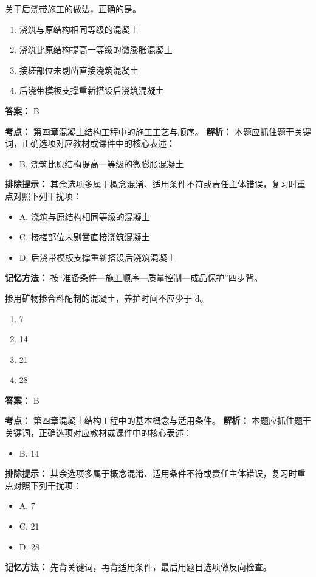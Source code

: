 \documentclass[UTF8,fontset=fandol,11pt]{ctexart}
\begin{document}
\begin{quizbox}[title={第 78 题}]
关于后浇带施工的做法，正确的是。\\
\begin{enumerate}[label=\Alph*.]
\item 浇筑与原结构相同等级的混凝土
\item 浇筑比原结构提高一等级的微膨胀混凝土
\item 接槎部位未剔凿直接浇筑混凝土
\item 后浇带模板支撑重新搭设后浇筑混凝土
\end{enumerate}
\textbf{答案：} B
\vspace{0.25em}
\begin{answerbox}[title={考点解析}]
\textbf{考点：} 第四章混凝土结构工程中的施工工艺与顺序。
\textbf{解析：} 本题应抓住题干关键词，正确选项对应教材或课件中的核心表述：
\begin{itemize}
\item B. 浇筑比原结构提高一等级的微膨胀混凝土
\end{itemize}
\textbf{排除提示：} 其余选项多属于概念混淆、适用条件不符或责任主体错误，复习时重点对照下列干扰项：
\begin{itemize}
\item A. 浇筑与原结构相同等级的混凝土
\item C. 接槎部位未剔凿直接浇筑混凝土
\item D. 后浇带模板支撑重新搭设后浇筑混凝土
\end{itemize}
\textbf{记忆方法：} 按“准备条件—施工顺序—质量控制—成品保护”四步背。
\end{answerbox}
\end{quizbox}

\vspace{0.2em}

\begin{quizbox}[title={第 79 题}]
掺用矿物掺合料配制的混凝土，养护时间不应少于 d。\\
\begin{enumerate}[label=\Alph*.]
\item 7
\item 14
\item 21
\item 28
\end{enumerate}
\textbf{答案：} B
\vspace{0.25em}
\begin{answerbox}[title={考点解析}]
\textbf{考点：} 第四章混凝土结构工程中的基本概念与适用条件。
\textbf{解析：} 本题应抓住题干关键词，正确选项对应教材或课件中的核心表述：
\begin{itemize}
\item B. 14
\end{itemize}
\textbf{排除提示：} 其余选项多属于概念混淆、适用条件不符或责任主体错误，复习时重点对照下列干扰项：
\begin{itemize}
\item A. 7
\item C. 21
\item D. 28
\end{itemize}
\textbf{记忆方法：} 先背关键词，再背适用条件，最后用题目选项做反向检查。
\end{answerbox}
\end{quizbox}
\end{document}
